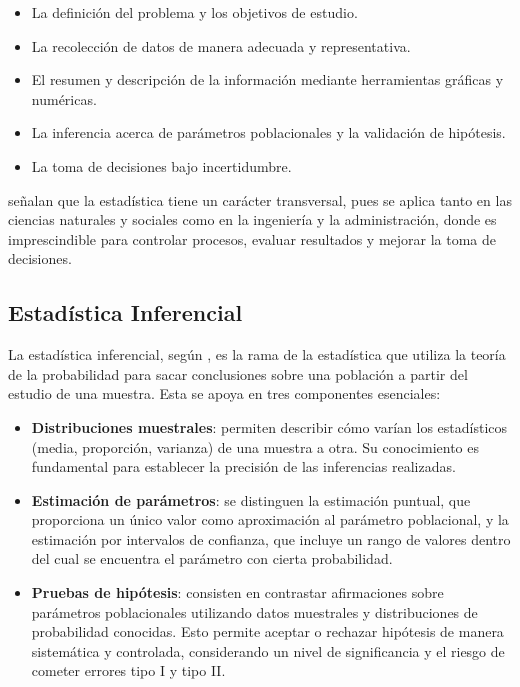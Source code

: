 \documentclass[letter,oneside,12pt,spanish]{report}
\begin{document}
\begin{itemize}
	\item La definición del problema y los objetivos de estudio.
	\item La recolección de datos de manera adecuada y representativa.
	\item El resumen y descripción de la información mediante herramientas gráficas y numéricas.
	\item La inferencia acerca de parámetros poblacionales y la validación de hipótesis.
	\item La toma de decisiones bajo incertidumbre.
\end{itemize}

\textcite{montgomery1996} señalan que la estadística tiene un carácter transversal, pues se aplica tanto en las ciencias naturales y sociales como en la ingeniería y la administración, donde es imprescindible para controlar procesos, evaluar resultados y mejorar la toma de decisiones.

\subsection{Estadística Inferencial}

La estadística inferencial, según \textcite{montgomery1996}, es la rama de la estadística que utiliza la teoría de la probabilidad para sacar conclusiones sobre una población a partir del estudio de una muestra. Esta se apoya en tres componentes esenciales:

\begin{itemize}
	\item \textbf{Distribuciones muestrales}: permiten describir cómo varían los estadísticos (media, proporción, varianza) de una muestra a otra. Su conocimiento es fundamental para establecer la precisión de las inferencias realizadas.
	
	\item \textbf{Estimación de parámetros}: se distinguen la estimación puntual, que proporciona un único valor como aproximación al parámetro poblacional, y la estimación por intervalos de confianza, que incluye un rango de valores dentro del cual se encuentra el parámetro con cierta probabilidad.
	
	\item \textbf{Pruebas de hipótesis}: consisten en contrastar afirmaciones sobre parámetros poblacionales utilizando datos muestrales y distribuciones de probabilidad conocidas. Esto permite aceptar o rechazar hipótesis de manera sistemática y controlada, considerando un nivel de significancia y el riesgo de cometer errores tipo I y tipo II.
\end{itemize}
\end{document}

